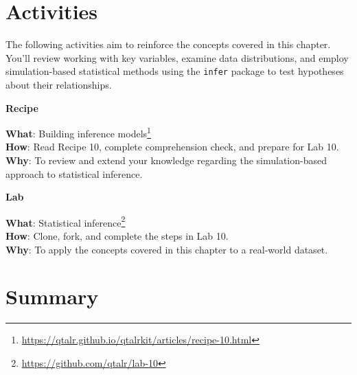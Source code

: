 \documentclass[
  letterpaper,
]{latex/krantz}
\theoremstyle{definition}
\theoremstyle{remark}
\DeclareRobustCommand{\href}[2]{#2\footnote{\url{#1}}}
\begin{document}
\section*{Activities}\label{activities-8}


The following activities aim to reinforce the concepts covered in this
chapter. You'll review working with key variables, examine data
distributions, and employ simulation-based statistical methods using the
\texttt{infer} package to test hypotheses about their relationships.

\begin{tcolorbox}[enhanced jigsaw, toprule=.15mm, breakable, colback=white, opacityback=0, leftrule=.75mm, bottomrule=.15mm, colframe=quarto-callout-color-frame, left=2mm, arc=.35mm, rightrule=.15mm]

\textbf{ Recipe}

\textbf{What}:
\href{https://qtalr.github.io/qtalrkit/articles/recipe-10.html}{Building
inference models}\\
\textbf{How}: Read Recipe 10, complete comprehension check, and prepare
for Lab 10.\\
\textbf{Why}: To review and extend your knowledge regarding the
simulation-based approach to statistical inference.

\end{tcolorbox}

\begin{tcolorbox}[enhanced jigsaw, toprule=.15mm, breakable, colback=white, opacityback=0, leftrule=.75mm, bottomrule=.15mm, colframe=quarto-callout-color-frame, left=2mm, arc=.35mm, rightrule=.15mm]

\textbf{ Lab}

\textbf{What}: \href{https://github.com/qtalr/lab-10}{Statistical
inference}\\
\textbf{How}: Clone, fork, and complete the steps in Lab 10.\\
\textbf{Why}: To apply the concepts covered in this chapter to a
real-world dataset.

\end{tcolorbox}

\section*{Summary}\label{summary-9}
\end{document}

